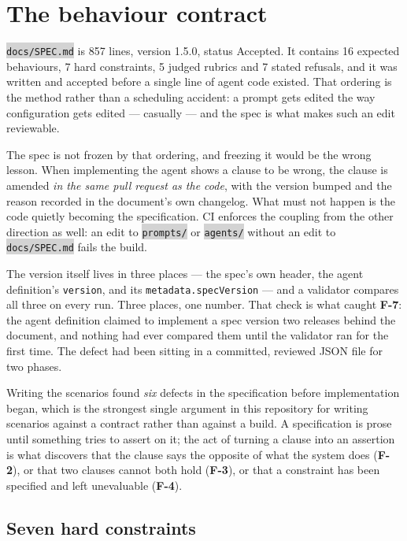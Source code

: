 \documentclass[11pt,a4paper]{article}
\newcommand{\repopath}[1]{\colorbox{lightgray}{\texttt{#1}}}
\newcommand{\finding}[1]{{\color{primaryblue}\textbf{#1}}}
\begin{document}
\section{The behaviour contract}

\repopath{docs/SPEC.md} is 857 lines, version 1.5.0, status Accepted. It contains
16 expected behaviours, 7 hard constraints, 5 judged rubrics and 7 stated
refusals, and it was written and accepted before a single line of agent code
existed. That ordering is the method rather than a scheduling accident: a prompt
gets edited the way configuration gets edited --- casually --- and the spec is what
makes such an edit reviewable.

The spec is not frozen by that ordering, and freezing it would be the wrong
lesson. When implementing the agent shows a clause to be wrong, the clause is
amended \emph{in the same pull request as the code}, with the version bumped and
the reason recorded in the document's own changelog. What must not happen is the
code quietly becoming the specification. CI enforces the coupling from the other
direction as well: an edit to \repopath{prompts/} or \repopath{agents/} without an
edit to \repopath{docs/SPEC.md} fails the build.

The version itself lives in three places --- the spec's own header, the agent
definition's \texttt{version}, and its \texttt{metadata.specVersion} --- and a
validator compares all three on every run. Three places, one number. That check
is what caught \finding{F-7}: the agent definition claimed to implement a spec
version two releases behind the document, and nothing had ever compared them
until the validator ran for the first time. The defect had been sitting in a
committed, reviewed JSON file for two phases.

Writing the scenarios found \emph{six} defects in the specification before
implementation began, which is the strongest single argument in this repository
for writing scenarios against a contract rather than against a build. A
specification is prose until something tries to assert on it; the act of turning
a clause into an assertion is what discovers that the clause says the opposite of
what the system does (\finding{F-2}), or that two clauses cannot both hold
(\finding{F-3}), or that a constraint has been specified and left unevaluable
(\finding{F-4}).

\subsection{Seven hard constraints}
\end{document}
